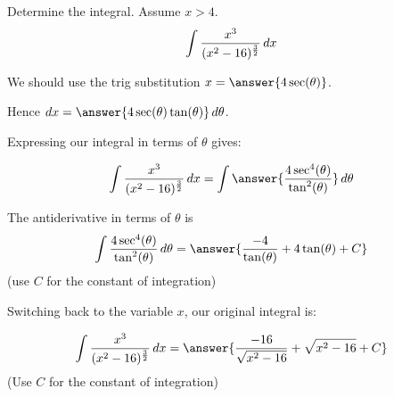 \documentclass{ximera}
\author{Jason Miller}
\begin{document}
\begin{exercise}
Determine the integral. Assume $x > 4$. 
\[
\int \frac{x^{3}}{(x^{2}-16)^{\frac{3}{2}}}  \mathop{}\!d x
\]

We should use the trig substitution $x=\answer{4\sec(\theta)}$. 

Hence $\d x=\answer{4 \sec(\theta)\tan(\theta) } \d \theta$.

Expressing our integral in terms of $\theta$ gives:

\begin{exercise}

\[
\int \frac{x^{3}}{(x^{2}-16)^{\frac{3}{2}}} \d x =\int \answer{ \frac{4 \sec^{4}(\theta)}{\tan^{2}(\theta)} } \d \theta
\]


\begin{exercise}
The antiderivative in terms of $\theta$ is 
\[
\int  \frac{4 \sec^{4}(\theta)}{\tan^{2}(\theta)}  \d \theta =\answer{  \frac{-4}{\tan(\theta)} + 4\tan(\theta)  +C  } 
\]
(use $C$ for the constant of integration)

\begin{exercise}
Switching back to the variable $x$, our original integral is:

\[
\int \frac{x^{3}}{(x^{2}-16)^{\frac{3}{2}}} \d x= \answer{\frac{-16}{\sqrt{x^{2}-16}} + \sqrt{x^{2}-16} + C }
\]
(Use $C$ for the constant of integration)

\end{exercise}
\end{exercise}
\end{exercise}
\end{exercise}
\end{document}
